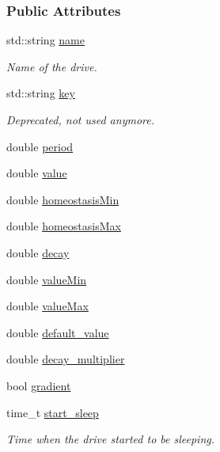 \subsubsection*{Public Attributes}
\begin{DoxyCompactItemize}
\item 
std\+::string \hyperlink{group__homeostasis_aacb834e6317eab8a360eeaa10286431d}{name}
\begin{DoxyCompactList}\small\item\em Name of the drive. \end{DoxyCompactList}\item 
std\+::string \hyperlink{group__homeostasis_a4db43d91ee5e904568449ca7ae5eb032}{key}
\begin{DoxyCompactList}\small\item\em Deprecated, not used anymore. \end{DoxyCompactList}\item 
double \hyperlink{group__homeostasis_a371c5d5dac25ea418cb1031b9f4551f3}{period}
\item 
double \hyperlink{group__homeostasis_a5417db9e7769d888db2bb0c293e78323}{value}
\item 
double \hyperlink{group__homeostasis_a631e678038c0758143956be67f13e869}{homeostasis\+Min}
\item 
double \hyperlink{group__homeostasis_aeb14a32eaee7ef9db95132656378c4c9}{homeostasis\+Max}
\item 
double \hyperlink{group__homeostasis_abaa8695fc4e715e87a74de50235483d8}{decay}
\item 
double \hyperlink{group__homeostasis_ac15651cc5321e8b6a4458daeffb5d305}{value\+Min}
\item 
double \hyperlink{group__homeostasis_abe87b7fff815dd30f0deda945d851d4d}{value\+Max}
\item 
double \hyperlink{group__homeostasis_ad6ddf46ef65af0862fc35509fcde039e}{default\+\_\+value}
\item 
double \hyperlink{group__homeostasis_a04fc66af39d34d19820117c43b242d84}{decay\+\_\+multiplier}
\item 
bool \hyperlink{group__homeostasis_a634b05e0fce5a0860365521cd4a6d1ac}{gradient}
\item 
time\+\_\+t \hyperlink{group__homeostasis_adec23d880897e719e701d6f8a554a88b}{start\+\_\+sleep}
\begin{DoxyCompactList}\small\item\em Time when the drive started to be sleeping. \end{DoxyCompactList}\item 

\end{DoxyCompactItemize}

